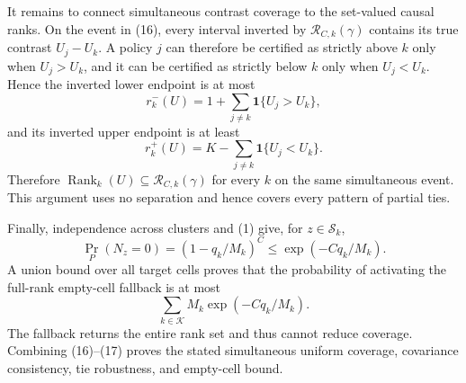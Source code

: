 It remains to connect simultaneous contrast coverage to the set-valued causal ranks.  On the event in (16), every interval inverted by \(\mathcal R_{C,k}(\gamma)\) contains its true contrast \(U_j-U_k\).  A policy \(j\) can therefore be certified as strictly above \(k\) only when \(U_j>U_k\), and it can be certified as strictly below \(k\) only when \(U_j<U_k\).  Hence the inverted lower endpoint is at most
\[
r_k^-(U)=1+\sum_{j\ne k}\mathbf 1\{U_j>U_k\},
\]
and its inverted upper endpoint is at least
\[
r_k^+(U)=K-\sum_{j\ne k}\mathbf 1\{U_j<U_k\}.
\]
Therefore \(\operatorname{Rank}_k(U)\subseteq\mathcal R_{C,k}(\gamma)\) for every \(k\) on the same simultaneous event.  This argument uses no separation and hence covers every pattern of partial ties.

Finally, independence across clusters and (1) give, for \(z\in\mathcal S_k\),
\[
\Pr_P(N_z=0)=(1-q_k/M_k)^C\leq\exp(-Cq_k/M_k). \tag{17}
\]
A union bound over all target cells proves that the probability of activating the full-rank empty-cell fallback is at most
\[
\sum_{k\in\mathcal K}M_k\exp(-Cq_k/M_k).
\]
The fallback returns the entire rank set and thus cannot reduce coverage.  Combining (16)--(17) proves the stated simultaneous uniform coverage, covariance consistency, tie robustness, and empty-cell bound.